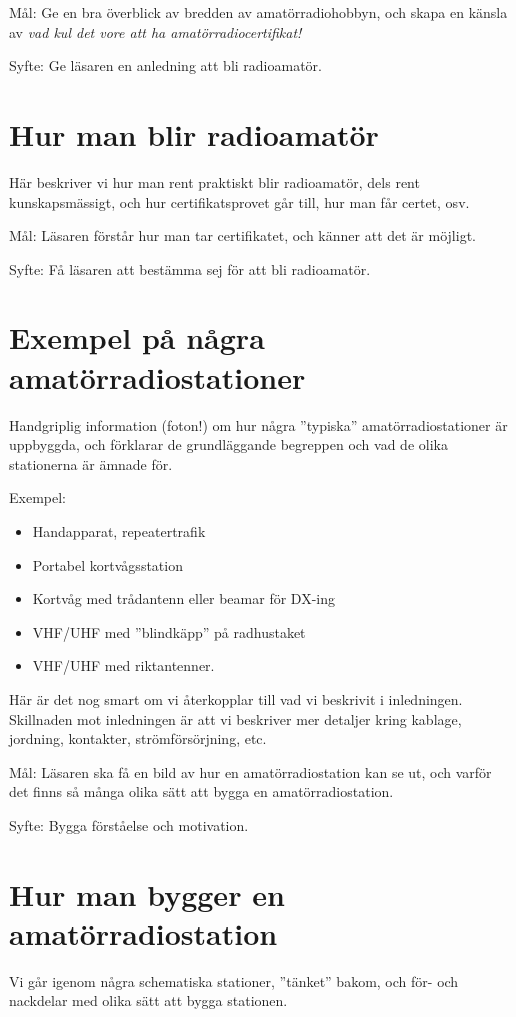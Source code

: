 \documentclass[a4paper,twoside,openright]{book}
\begin{document}
Mål: Ge en bra överblick av bredden av amatörradiohobbyn, och skapa en
känsla av \emph{vad kul det vore att ha amatörradiocertifikat!}

Syfte: Ge läsaren en anledning att bli radioamatör.

\section{Hur man blir radioamatör}
Här beskriver vi hur man rent praktiskt blir radioamatör, dels rent
kunskaps\-mässigt, och hur certifikatsprovet går till, hur man får
certet, osv.

Mål: Läsaren förstår hur man tar certifikatet, och känner att det är
möjligt.

Syfte: Få läsaren att bestämma sej för att bli radioamatör.

\section{Exempel på några amatörradiostationer}
Handgriplig information (foton!) om hur några ''typiska''
amatörradiostationer är uppbyggda, och förklarar de grundläggande
begreppen och vad de olika stationerna är ämnade för.

Exempel:
\begin{itemize}
\item Handapparat, repeatertrafik
\item Portabel kortvågsstation
\item Kortvåg med trådantenn eller beamar för DX-ing
\item VHF/UHF med ''blindkäpp'' på radhustaket
\item VHF/UHF med riktantenner.
\end{itemize}

Här är det nog smart om vi återkopplar till vad vi beskrivit i
inledningen. Skillnaden mot inledningen är att vi beskriver mer
detaljer kring kablage, jordning, kontakter, strömförsörjning, etc.

Mål: Läsaren ska få en bild av hur en amatörradiostation kan se ut,
och varför det finns så många olika sätt att bygga en
amatörradiostation.

Syfte: Bygga förståelse och motivation.

\section{Hur man bygger en amatörradiostation}
Vi går igenom några schematiska stationer, ''tänket'' bakom, och för-
och nackdelar med olika sätt att bygga stationen.
\end{document}
